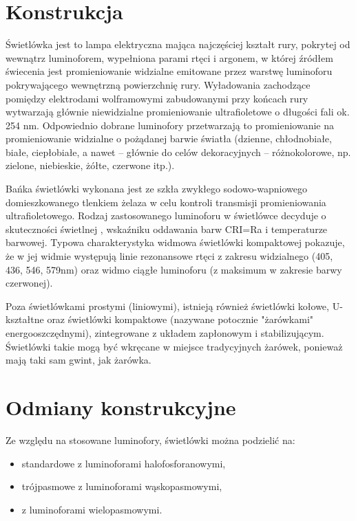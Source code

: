 \documentclass[12pt,a4paper]{book}
\begin{document}
\section*{Konstrukcja}

Świetlówka jest to lampa elektryczna mająca najczęściej kształt rury, pokrytej od wewnątrz luminoforem, wypełniona parami rtęci i argonem, w której źródłem świecenia jest promieniowanie widzialne emitowane przez warstwę luminoforu pokrywającego wewnętrzną powierzchnię rury. Wyładowania zachodzące pomiędzy elektrodami wolframowymi zabudowanymi przy końcach rury wytwarzają głównie niewidzialne promieniowanie ultrafioletowe o długości fali ok. 254 nm. Odpowiednio dobrane luminofory przetwarzają to promieniowanie na promieniowanie widzialne o pożądanej barwie światła (dzienne, chłodnobiałe, białe, ciepłobiałe, a nawet – głównie do celów dekoracyjnych – różnokolorowe, np. zielone, niebieskie, żółte, czerwone itp.).

Bańka świetlówki wykonana jest ze szkła zwykłego sodowo-wapniowego domieszkowanego tlenkiem żelaza w celu kontroli transmisji promieniowania ultrafioletowego. Rodzaj zastosowanego luminoforu w świetlówce decyduje o skuteczności świetlnej , wskaźniku oddawania barw CRI=Ra i temperaturze barwowej. Typowa charakterystyka widmowa świetlówki kompaktowej pokazuje, że w jej widmie występują linie rezonansowe rtęci z zakresu widzialnego (405, 436, 546, 579nm) oraz widmo ciągłe luminoforu (z maksimum w zakresie barwy czerwonej).

Poza świetlówkami prostymi (liniowymi), istnieją również świetlówki kołowe, U-kształtne oraz świetlówki kompaktowe (nazywane potocznie "żarówkami" energooszczędnymi), zintegrowane z układem zapłonowym i stabilizującym. Świetlówki takie mogą być wkręcane w miejsce tradycyjnych żarówek, ponieważ mają taki sam gwint, jak żarówka.

\section*{Odmiany konstrukcyjne}

Ze względu na stosowane luminofory, świetlówki można podzielić na:

\begin{itemize}
\item standardowe z luminoforami halofosforanowymi,
\item trójpasmowe z luminoforami wąskopasmowymi,
\item z luminoforami wielopasmowymi.
\end{itemize}
\end{document}
